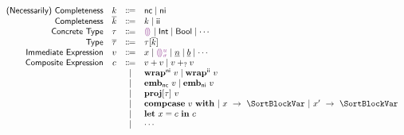 



\begin{center}
  \[\begin{array}{rccl}
    \SortNComplete & \SortNCompleteVar & \Coloneqq & \CNC \mid \CNI                                                                              \\
    \SortComplete  & \SortCompleteVar  & \Coloneqq & \SortNCompleteVar \mid \CII                                                                 \\
    \SortTypCon    & \SortTypConVar    & \Coloneqq & \TCHole \mid \TCInt \mid \TCBool \mid \cdots                                                   \\
    \SortTyp       & \SortTypVar       & \Coloneqq & \SortTypConVar[\SortCompleteVar]                                                            \\
    \SortImm       & \SortImmVar       & \Coloneqq & x \mid \EEHole{\SortHoleId}{\sigma}
                                                   \mid \underline{n} \mid \underline{b} \mid \cdots                                              \\
    \SortComp      & \SortCompVar      & \Coloneqq & \EPlusPrim{\SortImmVar}{\SortImmVar} 
                                                   \mid \EPlusIndet{\SortImmVar}{\SortImmVar} \\
                   &                   & \mid         & \EWrapIndet{\SortImmVar}
                                                   \mid \EWrapMaybe{\SortImmVar} \\
                   &                   & \mid         & \EEmbedPrim{\SortImmVar}
                                                   \mid \EEmbedIndet{\SortImmVar} \\
                   &                   & \mid         & \EProj{\SortImmVar}{\SortTypConVar} \\
                   &                   & \mid         & \EBranchWith{\SortImmVar}
                                                     \EBranchBr{x}{\SortBlockVar}
                                                    ~\EBranchBr{x'}{\SortBlockVar} \\
                   &                   & \mid         & \ELet{x}{\SortCompVar} \EInn \SortCompVar \\
                   &                   & \mid         & \cdots
  \end{array}\]
\end{center}
